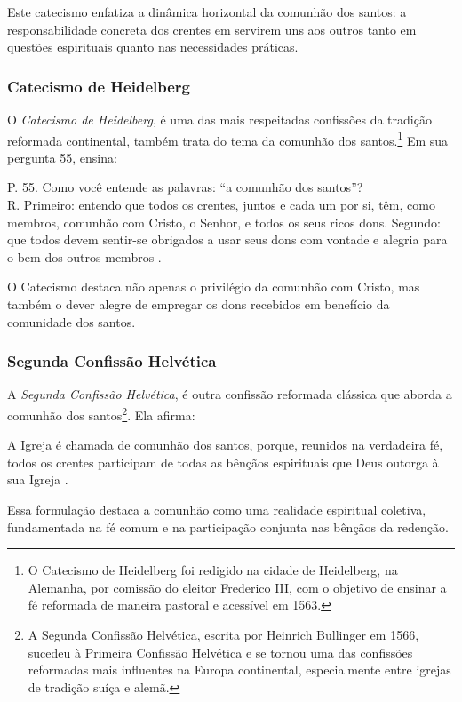 Este catecismo enfatiza a dinâmica horizontal da comunhão dos santos: a responsabilidade concreta dos crentes em servirem uns aos outros tanto em questões espirituais quanto nas necessidades práticas.

\subsubsection{Catecismo de Heidelberg}
O \textit{Catecismo de Heidelberg}, é uma das mais respeitadas confissões da tradição reformada continental, também trata do tema da comunhão dos santos.\footnote{O Catecismo de Heidelberg foi redigido na cidade de Heidelberg, na Alemanha, por comissão do eleitor Frederico III, com o objetivo de ensinar a fé reformada de maneira pastoral e acessível em 1563.} Em sua pergunta 55, ensina:
\begin{citacao}
P. 55. Como você entende as palavras: ``a comunhão dos santos''?\\
R. Primeiro: entendo que todos os crentes, juntos e cada um por si, têm, como membros, comunhão com Cristo, o Senhor, e todos os seus ricos dons. Segundo: que todos devem sentir-se obrigados a usar seus dons com vontade e alegria para o bem dos outros membros \cite{heidelberg}.
\end{citacao}

O Catecismo destaca não apenas o privilégio da comunhão com Cristo, mas também o dever alegre de empregar os dons recebidos em benefício da comunidade dos santos.

\subsubsection{Segunda Confissão Helvética}
A \textit{Segunda Confissão Helvética}, é outra confissão reformada clássica que aborda a comunhão dos santos\footnote{A Segunda Confissão Helvética, escrita por Heinrich Bullinger em 1566, sucedeu à Primeira Confissão Helvética e se tornou uma das confissões reformadas mais influentes na Europa continental, especialmente entre igrejas de tradição suíça e alemã.}. Ela afirma:
\begin{citacao}
A Igreja é chamada de comunhão dos santos, porque, reunidos na verdadeira fé, todos os crentes participam de todas as bênçãos espirituais que Deus outorga à sua Igreja \cite{helvetica}.
\end{citacao}

Essa formulação destaca a comunhão como uma realidade espiritual coletiva, fundamentada na fé comum e na participação conjunta nas bênçãos da redenção.

